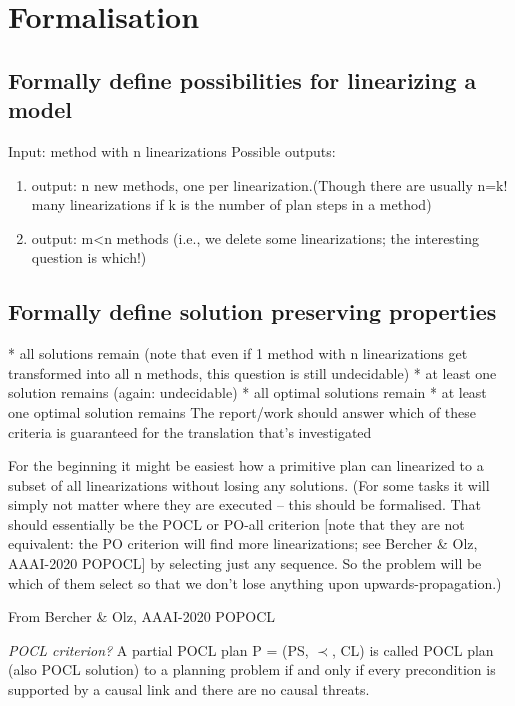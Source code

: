\section{Formalisation}


\subsection{Formally define possibilities for linearizing a model}
Input: method with n linearizations \newline
Possible outputs:
\begin{enumerate}
	\item output: n new methods, one per linearization.(Though there are usually n=k! many linearizations if k is the number of plan steps in a method)
	\item output: m<n methods (i.e., we delete some linearizations; the interesting question is which!) 
\end{enumerate}


\subsection{Formally define solution preserving properties}
* all solutions remain (note that even if 1 method with n linearizations get transformed into all n methods, this question is still undecidable)
* at least one solution remains (again: undecidable)
* all optimal solutions remain
* at least one optimal solution remains
The report/work should answer which of these criteria is guaranteed for the translation that's investigated

 
For the beginning it might be easiest how a primitive plan can linearized to a subset of all linearizations without losing any solutions. (For some tasks it will simply not matter where they are executed -- this should be formalised. That should essentially be the POCL or PO-all criterion [note that they are not equivalent: the PO criterion will find more linearizations; see Bercher \& Olz, AAAI-2020 POPOCL] by selecting just any sequence. So the problem will be which of them select so that we don't lose anything upon upwards-propagation.)


From Bercher \& Olz, AAAI-2020 POPOCL 

\emph{POCL criterion?} A partial POCL plan P = (PS, $\prec$, CL) is called POCL plan (also POCL solution) to a planning problem if and only if every precondition is supported by a causal link and there are no causal threats.


